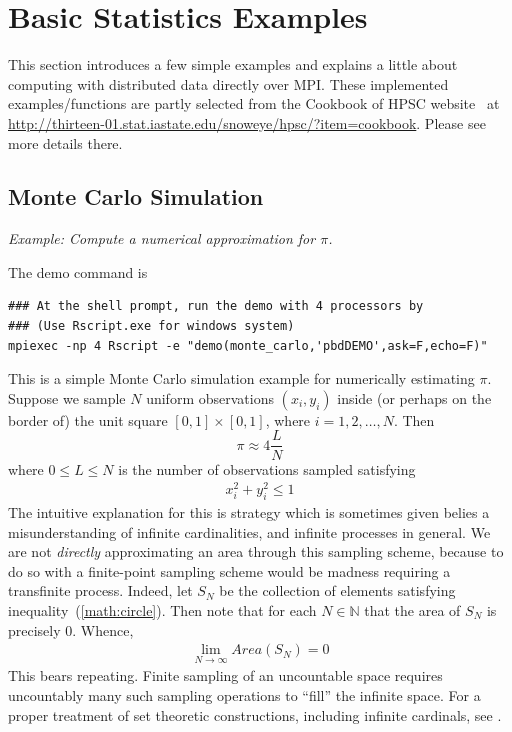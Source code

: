 \chapter[Basic Statistics Examples]{Basic Statistics Examples}
\label{sec:statistics_examples}

This section introduces a few simple examples and explains a little about computing with 
distributed data directly over MPI. 
These implemented examples/functions are partly
selected from the Cookbook of HPSC website~\citep{hpsc2011} at
\url{http://thirteen-01.stat.iastate.edu/snoweye/hpsc/?item=cookbook}.
Please see more details there.

\section[Monte Carlo Simulation]{Monte Carlo Simulation}
\label{sec:monte_carlo}

\emph{Example:  Compute a numerical approximation for $\pi$.}

The demo command is
\begin{lstlisting}
### At the shell prompt, run the demo with 4 processors by
### (Use Rscript.exe for windows system)
mpiexec -np 4 Rscript -e "demo(monte_carlo,'pbdDEMO',ask=F,echo=F)"
\end{lstlisting}

This is a simple Monte Carlo simulation example for numerically estimating $\pi$.
Suppose we sample $N$ uniform observations $(x_i, y_i)$ inside (or perhaps on the border of) the unit square $[0, 1]\times [0,1]$,
where $i = 1, 2, \ldots, N$.  Then
\begin{equation}
\pi \approx 4\frac{L}{N}
\label{eqn:pi}
\end{equation}
where $0\leq L\leq N$ is the number of observations sampled satisfying
\begin{align}
x_i^2+y_i^2 \leq 1\label{math:circle}
\end{align}
The intuitive explanation for this is strategy which is sometimes given belies a misunderstanding of infinite cardinalities, and infinite processes in general.  We are not \emph{directly} approximating an area through this sampling scheme, because to do so with a finite-point sampling scheme would be madness requiring a transfinite process.  Indeed, let $S_N$ be the collection of elements satisfying inequality~(\ref{math:circle}).  Then note that for each $N\in\mathbb{N}$ that the area of $S_N$ is precisely 0.  Whence,
\begin{align*}
\lim_{N\rightarrow\infty} Area(S_N) = 0
\end{align*}
This bears repeating.  Finite sampling of an uncountable space requires uncountably many such sampling operations to ``fill'' the infinite space.  For a proper treatment of set theoretic constructions, including infinite cardinals, see \citep{kunen}.

